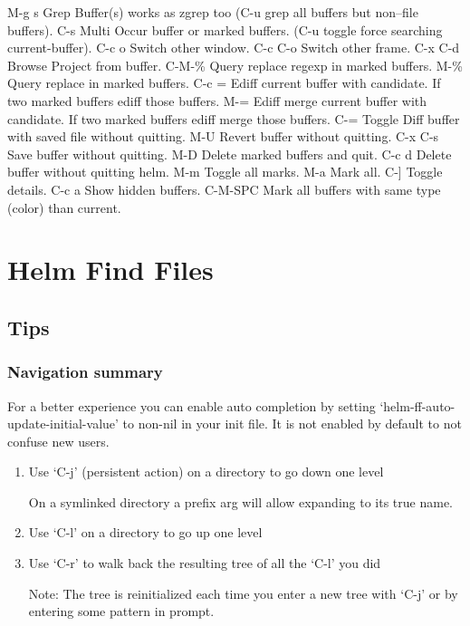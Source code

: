 \documentclass[11pt]{article}
\begin{document}
M-g s		Grep Buffer(s) works as zgrep too (C-u grep all buffers but non--file buffers).
C-s		Multi Occur buffer or marked buffers. (C-u toggle force searching current-buffer).
C-c o		Switch other window.
C-c C-o		Switch other frame.
C-x C-d		Browse Project from buffer.
C-M-\%		Query replace regexp in marked buffers.
M-\%		Query replace in marked buffers.
C-c =		Ediff current buffer with candidate.  If two marked buffers ediff those buffers.
M-=		Ediff merge current buffer with candidate.  If two marked buffers ediff merge those buffers.
C-=		Toggle Diff buffer with saved file without quitting.
M-U		Revert buffer without quitting.
C-x C-s		Save buffer without quitting.
M-D		Delete marked buffers and quit.
C-c d		Delete buffer without quitting helm.
M-m		Toggle all marks.
M-a		Mark all.
C-]		Toggle details.
C-c a		Show hidden buffers.
C-M-SPC		Mark all buffers with same type (color) than current.

\section{Helm Find Files}
\label{sec:orgb41b518}

\subsection{Tips}
\label{sec:org8745a5a}

\subsubsection{Navigation summary}
\label{sec:org855b74a}

For a better experience you can enable auto completion by setting
‘helm-ff-auto-update-initial-value’ to non-nil in your init file.
It is not enabled by default to not confuse new users.

\begin{enumerate}
\item Use ‘C-j’ (persistent action) on a directory to go down one level
\label{sec:orgc63659a}

On a symlinked directory a prefix arg will allow expanding to its true name.

\item Use ‘C-l’ on a directory to go up one level
\label{sec:org8f288d9}

\item Use ‘C-r’ to walk back the resulting tree of all the ‘C-l’ you did
\label{sec:orgf885a5b}

Note: The tree is reinitialized each time you enter a new tree with ‘C-j’
or by entering some pattern in prompt.
\end{enumerate}
\end{document}
